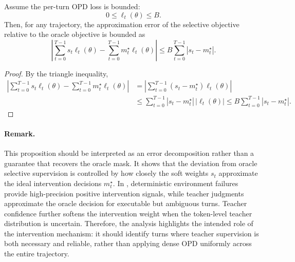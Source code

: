 \begin{proposition}
Assume the per-turn OPD loss is bounded:
\begin{equation}
    0 \leq \ell_t(\theta) \leq B.
\end{equation}
Then, for any trajectory, the approximation error of the selective objective relative to the oracle objective is bounded as
\begin{equation}
    \left|
    \sum_{t=0}^{T-1}
    s_t \ell_t(\theta)
    -
    \sum_{t=0}^{T-1}
    m_t^\star \ell_t(\theta)
    \right|
    \leq
    B
    \sum_{t=0}^{T-1}
    |s_t - m_t^\star|.
\end{equation}
\end{proposition}

\begin{proof}
By the triangle inequality,
\begin{align}
    \left|
    \sum_{t=0}^{T-1}
    s_t \ell_t(\theta)
    -
    \sum_{t=0}^{T-1}
    m_t^\star \ell_t(\theta)
    \right|
    &=
    \left|
    \sum_{t=0}^{T-1}
    (s_t-m_t^\star)\ell_t(\theta)
    \right| \\
    &\leq
    \sum_{t=0}^{T-1}
    |s_t-m_t^\star|\,|\ell_t(\theta)|
    \leq
    B
    \sum_{t=0}^{T-1}
    |s_t-m_t^\star|.
\end{align}
\end{proof}

\paragraph{Remark.}
This proposition should be interpreted as an error decomposition rather than a guarantee that \ours recovers the oracle mask.
%
It shows that the deviation from oracle selective supervision is controlled by how closely the soft weights $s_t$ approximate the ideal intervention decisions $m_t^\star$.
%
In \ours, deterministic environment failures provide high-precision positive intervention signals, while teacher judgments approximate the oracle decision for executable but ambiguous turns.
%
Teacher confidence further softens the intervention weight when the token-level teacher distribution is uncertain.
%
Therefore, the analysis highlights the intended role of the intervention mechanism: it should identify turns where teacher supervision is both necessary and reliable, rather than applying dense OPD uniformly across the entire trajectory.
%